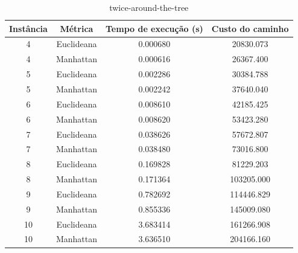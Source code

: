 \documentclass{article}
\begin{document}
\begin{table}[H]
\centering
\caption{twice-around-the-tree}
\vspace{0.5cm}
\begin{tabular}{cccc}

Instância & Métrica & Tempo de execu{\c c}{\~a}o (s) & Custo do caminho \\

\hline                          
4 & Euclideana & 0.000680 & 20830.073 \\
4 & Manhattan & 0.000616 & 26367.400 \\
5 & Euclideana & 0.002286 & 30384.788 \\
5 & Manhattan & 0.002242 & 37640.040 \\
6 & Euclideana & 0.008610 & 42185.425 \\
6 & Manhattan & 0.008620 & 53423.280 \\
7 & Euclideana & 0.038626 & 57672.807 \\
7 & Manhattan & 0.038480 & 73016.800 \\
8 & Euclideana & 0.169828 & 81229.203 \\
8 & Manhattan & 0.171364 & 103205.000 \\
9 & Euclideana & 0.782692 & 114446.829 \\
9 & Manhattan & 0.855336 & 145009.080 \\
10 & Euclideana & 3.683414 & 161266.908 \\
10 & Manhattan & 3.636510 & 204166.160 \\

\end{tabular}
\end{table}
\end{document}
